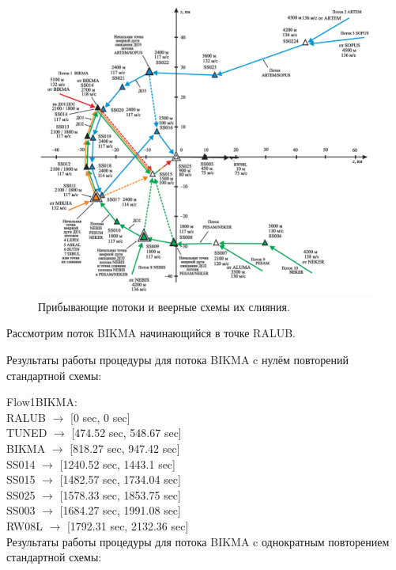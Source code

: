 \documentclass[12pt, a4 paper]{article}
\theoremstyle{plain}
\begin{document}
\begin{figure}[h]
  \begin{center}
      \includegraphics[scale=0.25]{Koltsovo02.png}
        \caption{Прибывающие потоки и веерные схемы их слияния.}                                                                             
    \label{KoltsLand} 
  \end{center}
\end{figure}

Рассмотрим поток BIKMA начинающийся в точке RALUB.

Результаты работы процедуры для потока BIKMA c нулём повторений стандартной схемы:

\noindent Flow1BIKMA:\\
RALUB $\rightarrow$ [0 sec, 0 sec]\\
TUNED $\rightarrow$ [474.52 sec, 548.67 sec]\\
BIKMA $\rightarrow$ [818.27 sec, 947.42 sec]\\
SS014 $\rightarrow$ [1240.52 sec, 1443.1 sec]\\
SS015 $\rightarrow$ [1482.57 sec, 1734.04 sec]\\
SS025 $\rightarrow$ [1578.33 sec, 1853.75 sec]\\
SS003 $\rightarrow$ [1684.27 sec, 1991.08 sec]\\
RW08L $\rightarrow$ [1792.31 sec, 2132.36 sec]\\


Результаты работы процедуры для потока BIKMA c однократным повторением стандартной схемы:
\end{document}
